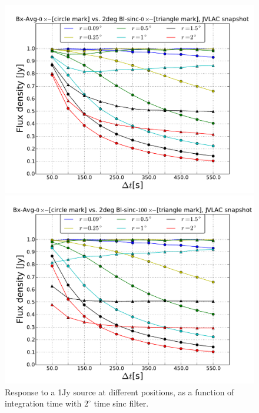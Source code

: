 \documentclass[useAMS,usenatbib]{mn2e}
\begin{document}
\begin{figure}
  \centering
\begin{minipage}{0.36\linewidth}\includegraphics[width=1.\textwidth]{./Figures/max-integ-time-sinc-w1x1-fov2.pdf}
	\caption{Response to a 1Jy source at different positions, as a function of integration time with $2^{\circ}$ time sinc filter.}
	\label{fig:max-integ-time-sinc-w1x1-fov2}
	\end{minipage} \hspace{1cm}
\begin{minipage}{0.36\linewidth}\includegraphics[width=1.\textwidth]{./Figures/max-integ-time-sinc-w100x1-fov2.pdf}

\end{minipage}
\end{figure}
\end{document}
